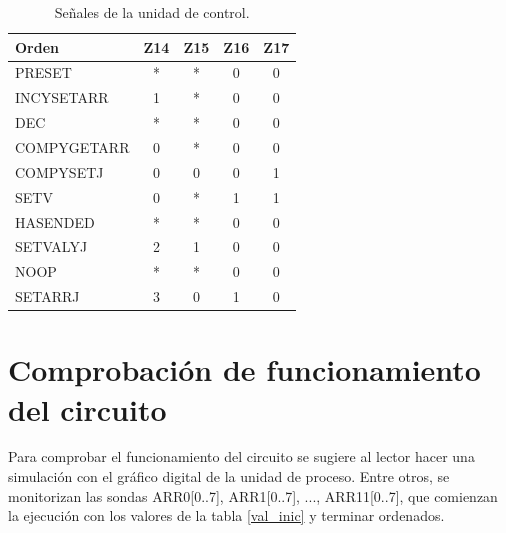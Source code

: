 \documentclass[12pt,a4paper,oneside]{article}
\begin{document}
\begin{table}[H]
    \begin{tabular}{|l|cccc|}
    \hline
    Orden              & \multicolumn{1}{l}{Z14} & \multicolumn{1}{l}{Z15} & \multicolumn{1}{l}{Z16} & \multicolumn{1}{l|}{Z17} \\ \hline
    PRESET             & *                       & *                       & 0                       & 0                        \\ \cline{1-2} \hline
    INCYSETARR         & 1                       & *                       & 0                       & 0                        \\ \cline{1-2} \hline
    DEC                & *                       & *                       & 0                       & 0                        \\ \cline{1-2} \hline
    COMPYGETARR        & 0                       & *                       & 0                       & 0                        \\ \cline{1-2} \hline
    COMPYSETJ          & 0                       & 0                       & 0                       & 1                        \\ \cline{1-2} \hline
    SETV               & 0                       & *                       & 1                       & 1                        \\ \cline{1-2} \hline
    HASENDED           & *                       & *                       & 0                       & 0                        \\ \cline{1-2} \hline
    SETVALYJ           & 2                       & 1                       & 0                       & 0                        \\ \cline{1-2} \hline
    NOOP               & *                       & *                       & 0                       & 0                        \\ \cline{1-2} \hline
    SETARRJ            & 3                       & 0                       & 1                       & 0                        \\ \cline{1-2} \hline
    \end{tabular}   
    \caption{Señales de la unidad de control.}
\end{table}

\section{Comprobación de funcionamiento del circuito}
Para comprobar el funcionamiento del circuito se sugiere al lector hacer una simulación con el gráfico digital de la 
unidad de proceso. Entre otros, se monitorizan las sondas ARR0[0..7], ARR1[0..7], ..., ARR11[0..7], que comienzan la 
ejecución con los valores de la tabla \ref{val_inic} y terminar ordenados.
\end{document}
